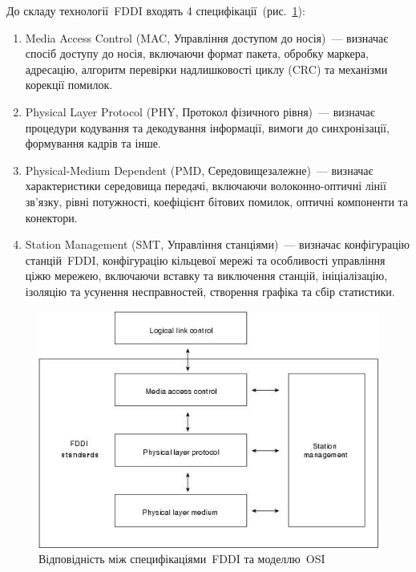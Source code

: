 \documentclass[
	a4paper,
	oneside,
	BCOR = 10mm,
	DIV = 12,
	12pt,
	headings = normal,
]{scrartcl}
\begin{document}
		До складу технології~\textenglish{FDDI} входять 4 специфікації~(рис.~\ref{fig:fddi-osi-mapping}):
		\begin{enumerate}
			\item \textenglish{Media Access Control} (\textenglish{MAC}, Управління доступом до носія)~— визначає спосіб доступу до носія, включаючи формат пакета, обробку маркера, адресацію, алгоритм перевірки надлишковості циклу (\textenglish{CRC}) та механізми корекції помилок.
			\item \textenglish{Physical Layer Protocol} (\textenglish{PHY}, Протокол фізичного рівня)~— визначає процедури кодування та декодування інформації, вимоги до синхронізації, формування кадрів та інше.
			\item \textenglish{Physical-Medium Dependent} (\textenglish{PMD}, Середовищезалежне)~— визначає характеристики середовища передачі, включаючи волоконно-оптичні лінії зв'язку, рівні потужності, коефіцієнт бітових помилок, оптичні компоненти та конектори.
			\item \textenglish{Station Management} (\textenglish{SMT}, Управління станціями)~— визначає конфігурацію станцій~\textenglish{FDDI}, конфігурацію кільцевої мережі та особливості управління ціжю мережею, включаючи вставку та виключення станцій, ініціалізацію, ізоляцію та усунення несправностей, створення графіка та сбір статистики.
		\end{enumerate}

		\begin{figure}[!htbp]
			\centering
			\includegraphics[height = 10\baselineskip]{./assets/y03s01-telecom-homework-01-p03-fddi-to-osi-map.jpg}
			\caption{Відповідність між специфікаціями~\textenglish{FDDI} та моделлю~\textenglish{OSI}}
			\label{fig:fddi-osi-mapping}
		\end{figure}
\end{document}
